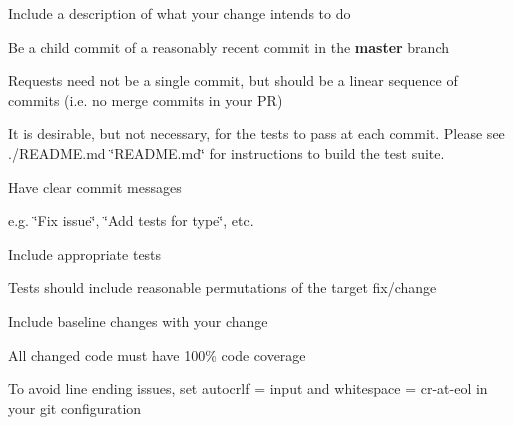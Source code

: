 \begin{DoxyItemize}
\item Include a description of what your change intends to do
\item Be a child commit of a reasonably recent commit in the {\bfseries master} branch
\begin{DoxyItemize}
\item Requests need not be a single commit, but should be a linear sequence of commits (i.\+e. no merge commits in your PR)
\end{DoxyItemize}
\item It is desirable, but not necessary, for the tests to pass at each commit. Please see ./\+R\+E\+A\+D\+ME.md \char`\"{}\+R\+E\+A\+D\+M\+E.\+md\char`\"{} for instructions to build the test suite.
\item Have clear commit messages
\begin{DoxyItemize}
\item e.\+g. \char`\"{}\+Fix issue\char`\"{}, \char`\"{}\+Add tests for type\char`\"{}, etc.
\end{DoxyItemize}
\item Include appropriate tests
\begin{DoxyItemize}
\item Tests should include reasonable permutations of the target fix/change
\item Include baseline changes with your change
\item All changed code must have 100\% code coverage
\end{DoxyItemize}
\item To avoid line ending issues, set {\ttfamily autocrlf = input} and {\ttfamily whitespace = cr-\/at-\/eol} in your git configuration 
\end{DoxyItemize}